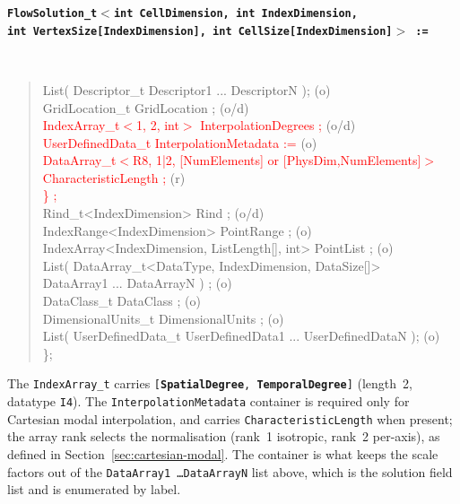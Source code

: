 \documentclass[11pt,letterpaper]{article}
\newif\ifvfourdraft
\newcommand{\vfourmark}{\ifvfourdraft\textcolor{v4violet}{\textbf{[v4]}}\ \fi}
\newenvironment{sidsnode}[1]{%
  \par\vspace{0.8em}%
  \noindent\colorbox{cgnslight!50}{\parbox{\dimexpr\linewidth-2\fboxsep}{%
    \raggedright\texttt{\textbf{\color{cgnsblue}#1}}}}\\[0.3em]%
  \begin{quote}\ttfamily
}{%
  \end{quote}\vspace{0.4em}%
}
\begin{document}
\begin{sidsnode}{FlowSolution\_t$<$int CellDimension, int IndexDimension,\\
\quad\quad int VertexSize[IndexDimension], int CellSize[IndexDimension]$>$ :=}
List( Descriptor\_t Descriptor1 ... DescriptorN );            \textrm{(o)}\\
GridLocation\_t GridLocation ;                                 \textrm{(o/d)}\\
\textcolor{red}{IndexArray\_t$<$1, 2, int$>$ InterpolationDegrees ;}      \textrm{(o/d)}\\
\textcolor{red}{UserDefinedData\_t InterpolationMetadata :=}                \textrm{(o)}\\
\quad\textcolor{red}{DataArray\_t$<$R8, 1|2, [NumElements] or [PhysDim,NumElements]$>$}\\
\quad\quad\textcolor{red}{CharacteristicLength ;}                           \textrm{(r)}\\
\textcolor{red}{\} ;}\\
Rind\_t<IndexDimension> Rind ;                                 \textrm{(o/d)}\\
IndexRange<IndexDimension> PointRange ;                        \textrm{(o)}\\
IndexArray<IndexDimension, ListLength[], int> PointList ;      \textrm{(o)}\\
List( DataArray\_t<DataType, IndexDimension, DataSize[]>\\
\quad\quad DataArray1 ... DataArrayN ) ;                       \textrm{(o)}\\
DataClass\_t DataClass ;                                       \textrm{(o)}\\
DimensionalUnits\_t DimensionalUnits ;                         \textrm{(o)}\\
List( UserDefinedData\_t UserDefinedData1 ... UserDefinedDataN ); \textrm{(o)}\\
\};
\end{sidsnode}

\noindent The \texttt{IndexArray\_t} carries
\texttt{[\textbf{SpatialDegree}, \textbf{TemporalDegree}]} (length~2, datatype \texttt{I4}).
The \texttt{InterpolationMetadata} container is required only for Cartesian modal
interpolation, and carries \texttt{CharacteristicLength} when present; the array
rank selects the normalisation (rank~1 isotropic, rank~2 per-axis), as defined in
Section~\ref{sec:cartesian-modal}.  \vfourmark The container is what keeps the
scale factors out of the \texttt{DataArray1 \ldots DataArrayN} list above, which
is the solution field list and is enumerated by label.
\end{document}
